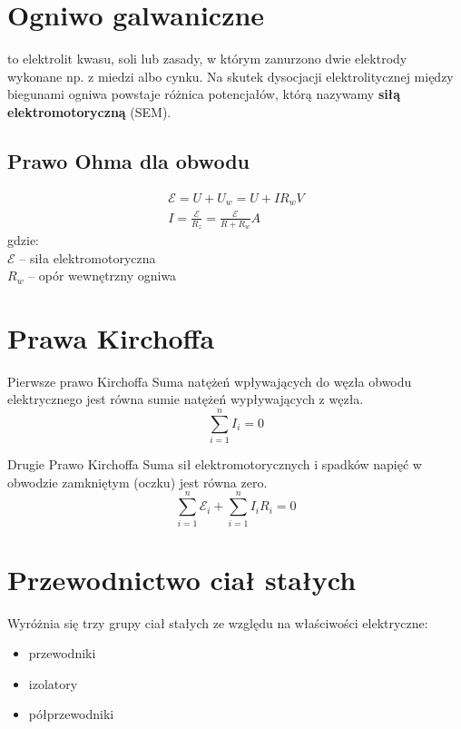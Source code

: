   \section{Ogniwo galwaniczne}
    \begin{definition}
       to elektrolit kwasu, soli lub zasady, w którym zanurzono dwie elektrody wykonane np. z miedzi albo cynku. Na skutek dysocjacji elektrolitycznej między biegunami ogniwa powstaje różnica potencjałów, którą nazywamy \textbf{siłą elektromotoryczną} (SEM).
    \end{definition}
    \subsection{Prawo Ohma dla obwodu}
      \begin{gather}
        \mathcal E = U + U_w = U + IR_w \unit{V}\\
        I = \frac{\mathcal E}{R_z} = \frac{\mathcal E}{R + R_w} \unit{A}
      \end{gather}
      gdzie:\\
      \tab $\mathcal E$ -- siła elektromotoryczna\\
      \tab $R_w$ -- opór wewnętrzny ogniwa
  \section{Prawa Kirchoffa}
  \begin{law}{Pierwsze prawo Kirchoffa}
    Suma natężeń wpływających do węzła obwodu elektrycznego jest równa sumie natężeń wypływających z węzła.
    \begin{equation}
      \sum_{i=1}^n I_i = 0
    \end{equation}
  \end{law}
  \begin{law}{Drugie Prawo Kirchoffa}
    Suma sił elektromotorycznych i spadków napięć w obwodzie zamkniętym (oczku) jest równa zero.
    \begin{equation}
      \sum_{i=1}^n \mathcal E_i + \sum_{i=1}^n I_iR_i = 0
    \end{equation}
  \end{law}
  \section{Przewodnictwo ciał stałych}
    Wyróżnia się trzy grupy ciał stałych ze względu na właściwości elektryczne:
    \begin{itemize}
      \item przewodniki
      \item izolatory
      \item półprzewodniki
    \end{itemize}

